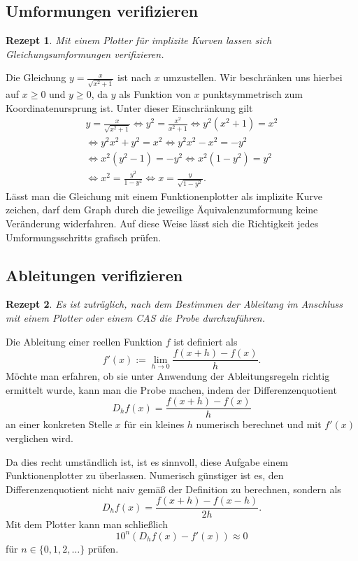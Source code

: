 \documentclass[a4paper,10pt,fleqn,twocolumn,twoside,dvipdfmx]{scrartcl}
\theoremstyle{rmbox}
\newtheorem{Rezept}{Rezept}[section]
\begin{document}
\subsection{Umformungen verifizieren}

\begin{Rezept}
Mit einem Plotter für implizite Kurven lassen sich
Gleichungsumformungen verifizieren.
\end{Rezept}

\noindent
Die Gleichung $y = \tfrac{x}{\sqrt{x^2+1}}$ ist nach $x$ umzustellen.
Wir beschränken uns hierbei auf $x\ge 0$ und $y\ge 0$, da $y$
als Funktion von $x$ punktsymmetrisch zum Koordinatenursprung ist.
Unter dieser Einschränkung gilt
\begin{gather*}
y = \tfrac{x}{\sqrt{x^2+1}}\iff y^2 = \tfrac{x^2}{x^2+1}
\iff y^2(x^2+1) = x^2\\
\iff y^2 x^2 + y^2 = x^2
\iff y^2 x^2 - x^2 = -y^2\\
\iff x^2 (y^2 - 1) = -y^2
\iff x^2 (1 - y^2) = y^2\\
\iff x^2 = \tfrac{y^2}{1-y^2}
\iff x = \tfrac{y}{\sqrt{1-y^2}}.
\end{gather*}
Lässt man die Gleichung mit einem Funktionenplotter als implizite Kurve
zeichen, darf dem Graph durch die jeweilige Äquivalenzumformung keine
Veränderung widerfahren. Auf diese Weise lässt sich die Richtigkeit
jedes Umformungsschritts grafisch prüfen.

\subsection{Ableitungen verifizieren}

\begin{Rezept}
Es ist zuträglich, nach dem Bestimmen der Ableitung im Anschluss
mit einem Plotter oder einem CAS die Probe durchzuführen.
\end{Rezept}

\noindent
Die Ableitung einer reellen Funktion $f$ ist definiert als%
\[f'(x) := \lim_{h\to 0}\frac{f(x+h)-f(x)}{h}.\]
Möchte man erfahren, ob sie unter Anwendung
der Ableitungsregeln richtig ermittelt wurde, kann man die Probe
machen, indem der Differenzenquotient%
\[D_h f(x) = \frac{f(x+h)-f(x)}{h}\]
an einer konkreten Stelle $x$ für ein kleines $h$ numerisch
berechnet und mit $f'(x)$ verglichen wird.

Da dies recht umständlich ist, ist es sinnvoll, diese Aufgabe einem
Funktionenplotter zu überlassen. Numerisch günstiger ist es, den
Differenzenquotient nicht naiv gemäß der Definition zu berechnen,
sondern als%
\[D_h f(x) = \frac{f(x+h)-f(x-h)}{2h}.\]
Mit dem Plotter kann man schließlich
\[10^n (D_h f(x) - f'(x)) \approx 0\]
für $n\in\{0,1,2,\ldots\}$ prüfen.
\end{document}
